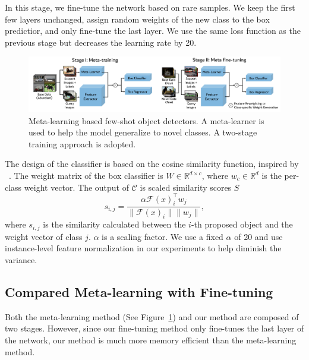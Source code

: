  In this stage, we fine-tune the network based on rare samples. We keep the first few layers unchanged, assign random weights of the new class to the box predictior, and only fine-tune the last layer. We use the same loss function as the previous stage but decreases the learning rate by 20.

\begin{figure}[ht]
    \centering
    \includegraphics[width=\linewidth]{figs/TFA_fig2.pdf}
    \vspace{-8mm}
    \caption{Meta-learning based few-shot object detectors. A meta-learner is used to help the model generalize to novel classes. A two-stage training approach is adopted.}
    \label{fig:meta_arch}
\end{figure}

 The design of the classifier is based on the cosine similarity function, inspired by ~\citet{gidaris2018dynamic,qi2018low}.
The weight matrix of the box classifier is $W\in\mathbb{R}^{d\times c}$, where $w_c\in\mathbb{R}^d$ is the per-class weight vector. The output of $\mathcal{C}$ is scaled similarity scores $S$
\begin{equation}
    s_{i,j} = \frac{\alpha \mathcal{F}(x)_i^\top w_j}{\|\mathcal{F}(x)_i\| \|w_j\|},
    \label{eq:classifier} 
\end{equation}
where $s_{i,j}$ is the similarity calculated between the $i$-th proposed object and the weight vector of class $j$. $\alpha$ is a scaling factor. We use a fixed $\alpha$ of 20 and use instance-level feature normalization in our experiments to help diminish the variance.

\subsection{Compared Meta-learning with Fine-tuning}
\label{sec:meta}
Both the meta-learning method (See Figure~\ref{fig:meta_arch}) and our method are composed of two stages. However, since our fine-tuning method only fine-tunes the last layer of the network, our method is much more memory efficient than the meta-learning method.
